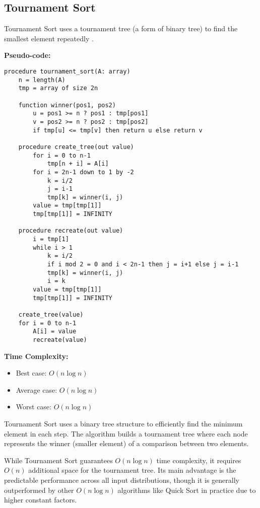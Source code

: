\documentclass[sigconf]{acmart}
\begin{document}
\subsection{Tournament Sort}
Tournament Sort uses a tournament tree (a form of binary tree) to find the smallest element repeatedly \cite{tournamentsort, stepanov1986using}.

\textbf{Pseudo-code:}
\begin{verbatim}
procedure tournament_sort(A: array)
    n = length(A)
    tmp = array of size 2n
    
    function winner(pos1, pos2)
        u = pos1 >= n ? pos1 : tmp[pos1]
        v = pos2 >= n ? pos2 : tmp[pos2]
        if tmp[u] <= tmp[v] then return u else return v
    
    procedure create_tree(out value)
        for i = 0 to n-1
            tmp[n + i] = A[i]
        for i = 2n-1 down to 1 by -2
            k = i/2
            j = i-1
            tmp[k] = winner(i, j)
        value = tmp[tmp[1]]
        tmp[tmp[1]] = INFINITY
    
    procedure recreate(out value)
        i = tmp[1]
        while i > 1
            k = i/2
            if i mod 2 = 0 and i < 2n-1 then j = i+1 else j = i-1
            tmp[k] = winner(i, j)
            i = k
        value = tmp[tmp[1]]
        tmp[tmp[1]] = INFINITY
    
    create_tree(value)
    for i = 0 to n-1
        A[i] = value
        recreate(value)
\end{verbatim}

\textbf{Time Complexity:}
\begin{itemize}
    \item Best case: $O(n \log n)$
    \item Average case: $O(n \log n)$
    \item Worst case: $O(n \log n)$
\end{itemize}

Tournament Sort uses a binary tree structure to efficiently find the minimum element in each step. The algorithm builds a tournament tree where each node represents the winner (smaller element) of a comparison between two elements.

While Tournament Sort guarantees $O(n \log n)$ time complexity, it requires $O(n)$ additional space for the tournament tree. Its main advantage is the predictable performance across all input distributions, though it is generally outperformed by other $O(n \log n)$ algorithms like Quick Sort in practice due to higher constant factors.
\end{document}
